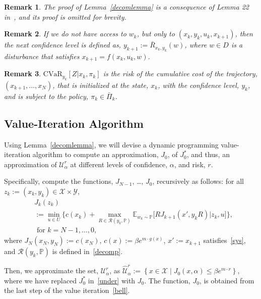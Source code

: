 \documentclass[letterpaper, 10 pt, conference]{ieeeconf}  %
\newtheorem{remark}{Remark}
\begin{document}
\begin{remark}
The proof of Lemma~\ref{decomlemma} is a consequence of Lemma 22 in~\cite{pflug2016time}, and its proof is omitted for brevity. 
\end{remark}
%
%
%
\begin{remark}
If we do not have access to $w_k$, but only to $(x_k, y_k, u_k, x_{k+1})$, then the next confidence level is defined as, 
$y_{k+1} := \bar{R}_{x_k, y_k}(w)$, where $w \in D$ is a disturbance that satisfies $x_{k+1} = f(x_k, u_k, w)$.
\end{remark}
%
%
\begin{remark}
$\text{CVaR}_{y_k} [ Z | x_k, \pi_k ]$ is the risk of 
the cumulative cost of the trajectory, $(x_{k+1}, \dots, x_N)$, that is initialized at the state, $x_k$, 
with the confidence level, $y_k$, and is subject to the policy, $\pi_k \in \bar{\Pi}_k$.
\end{remark}

\subsection{Value-Iteration Algorithm}
Using Lemma~\ref{decomlemma}, we will devise a dynamic programming value-iteration algorithm to compute an approximation, $J_0$, of $J_0^*$, 
and thus, an approximation of $\mathcal{U}_\alpha^r$ %
at different levels of confidence, $\alpha$, and risk, $r$.

Specifically, compute the functions, $J_{N-1}$, \dots, $J_0$, recursively as follows: for all $z_k := (x_k, y_k) \in \mathcal{X} \times \mathcal{Y}$,
\begin{equation}\begin{aligned}
& J_k(z_k) \\
&:= {\underset{u \in U}\min} \Big\{ c(x_k) + {\underset{R \in \mathcal{R}(y_k, \mathbb{P})}\max} \mathbb{E}_{w_k \sim \mathbb{P}}\big[ R J_{k+1}(x', y_k R) \big| z_k, u \big] \Big\}, \\
& \text{ for }k = N-1, \dots, 0,
\label{bell}\end{aligned}\end{equation}
where $J_N(x_N, y_N) := c(x_N)$, $c(x) := \beta e^{m \cdot g(x)}$, $x' := x_{k+1}$ satisfies~\eqref{sys}, 
and $\mathcal{R}(y_k, \mathbb{P})$ is defined in~\eqref{decomp}. 

Then, we approximate the set, $\mathcal{U}_{\alpha}^r$, as $\widehat{\mathcal{U}}_{\alpha}^r := \left\{ x \in \mathcal{X} \mid J_0(x, \alpha) \leq \beta e^{m \cdot r}\right\}$, 
where we have replaced $J_0^*$ in~\eqref{under} with $J_0$. The function, $J_0$, is obtained from the last step of the value iteration~\eqref{bell}. 
\end{document}
